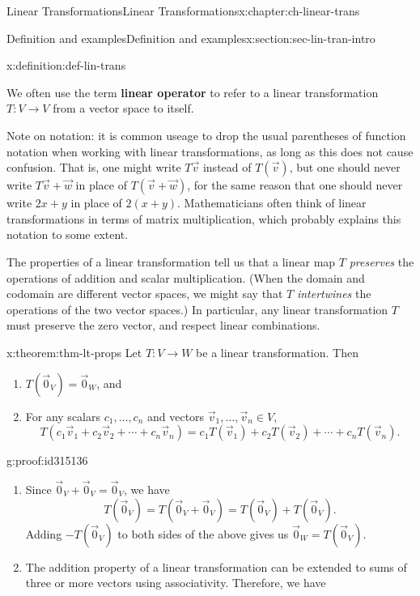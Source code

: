 \documentclass[oneside,10pt,]{book}
\newcommand{\terminology}[1]{\textbf{#1}}
\numberwithin{equation}{section}
\begin{document}
\begin{chapterptx}{Linear Transformations}{}{Linear Transformations}{}{}{x:chapter:ch-linear-trans}
\begin{sectionptx}{Definition and examples}{}{Definition and examples}{}{}{x:section:sec-lin-tran-intro}
\begin{definition}{}{x:definition:def-lin-trans}
\begin{enumerate}
\end{enumerate}
We often use the term \terminology{linear operator} to refer to a linear transformation \(T:V\to V\) from a vector space to itself.%
\end{definition}
Note on notation: it is common useage to drop the usual parentheses of function notation when working with linear transformations, as long as this does not cause confusion. That is, one might write \(T\vec{v}\) instead of \(T(\vec{v})\), but one should never write \(T\vec{v}+\vec{w}\) in place of \(T(\vec{v}+\vec{w})\), for the same reason that one should never write \(2x+y\) in place of \(2(x+y)\). Mathematicians often think of linear transformations in terms of matrix multiplication, which probably explains this notation to some extent.%
\par
The properties of a linear transformation tell us that a linear map \(T\) \emph{preserves} the operations of addition and scalar multiplication. (When the domain and codomain are different vector spaces, we might say that \(T\) \emph{intertwines} the operations of the two vector spaces.) In particular, any linear transformation \(T\) must preserve the zero vector, and respect linear combinations.%
\begin{theorem}{}{}{x:theorem:thm-lt-props}%
Let \(T:V\to W\) be a linear transformation. Then%
\begin{enumerate}
\item{}\(T(\vec{0}_V) = \vec{0}_W\), and%
\item{}For any scalars \(c_1,\ldots, c_n\) and vectors \(\vec{v}_1,\ldots, \vec{v}_n\in V\),%
\begin{equation*}
T(c_1\vec{v}_1+c_2\vec{v}_2+\cdots + c_n\vec{v}_n) = c_1T(\vec{v}_1)+c_2T(\vec{v}_2)+\cdots + c_nT(\vec{v}_n)\text{.}
\end{equation*}
%
\end{enumerate}
%
\end{theorem}
\begin{proofptx}{}{g:proof:id315136}
%
\begin{enumerate}
\item{}Since \(\vec{0}_V+\vec{0}_V = \vec{0}_V\), we have%
\begin{equation*}
T(\vec{0}_V) = T(\vec{0}_V+\vec{0}_V) = T(\vec{0}_V)+T(\vec{0}_V)\text{.}
\end{equation*}
Adding \(-T(\vec{0}_V)\) to both sides of the above gives us \(\vec{0}_W = T(\vec{0}_V)\).%
\item{}The addition property of a linear transformation can be extended to sums of three or more vectors using associativity. Therefore, we have%

\end{enumerate}
\end{proofptx}
\end{sectionptx}
\end{chapterptx}
\end{document}
